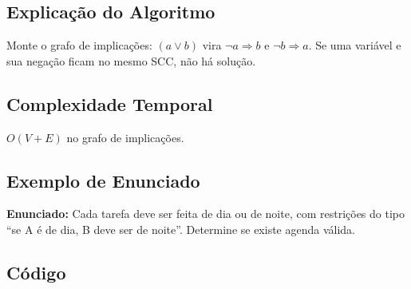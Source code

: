 \subsection{Explicação do Algoritmo}
Monte o grafo de implicações: $(a \vee b)$ vira $\neg a \Rightarrow b$ e $\neg b \Rightarrow a$. Se uma variável e sua negação ficam no mesmo SCC, não há solução.

\subsection{Complexidade Temporal}
$O(V + E)$ no grafo de implicações.

\subsection{Exemplo de Enunciado}
\begin{exemplodiabox}
\textbf{Enunciado:} Cada tarefa deve ser feita de dia ou de noite, com restrições do tipo ``se A é de dia, B deve ser de noite''. Determine se existe agenda válida.
\end{exemplodiabox}

\subsection{Código}
